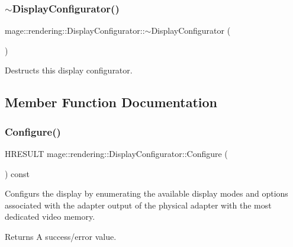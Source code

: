 \subsubsection{\texorpdfstring{$\sim$\+Display\+Configurator()}{~DisplayConfigurator()}}
{\footnotesize\ttfamily mage\+::rendering\+::\+Display\+Configurator\+::$\sim$\+Display\+Configurator (\begin{DoxyParamCaption}{ }\end{DoxyParamCaption})\hspace{0.3cm}{\ttfamily [default]}}

Destructs this display configurator. 

\subsection{Member Function Documentation}
\mbox{\label{classmage_1_1rendering_1_1_display_configurator_abeafddcb31aea4ee7235ca5509f1b321}} 
\subsubsection{\texorpdfstring{Configure()}{Configure()}}
{\footnotesize\ttfamily H\+R\+E\+S\+U\+LT mage\+::rendering\+::\+Display\+Configurator\+::\+Configure (\begin{DoxyParamCaption}{ }\end{DoxyParamCaption}) const}

Configurs the display by enumerating the available display modes and options associated with the adapter output of the physical adapter with the most dedicated video memory.

\begin{DoxyReturn}{Returns}
A success/error value. 
\end{DoxyReturn}
\mbox{\label{classmage_1_1rendering_1_1_display_configurator_a5b0440099e3e31977ffaf8072c9fb33f}} 
